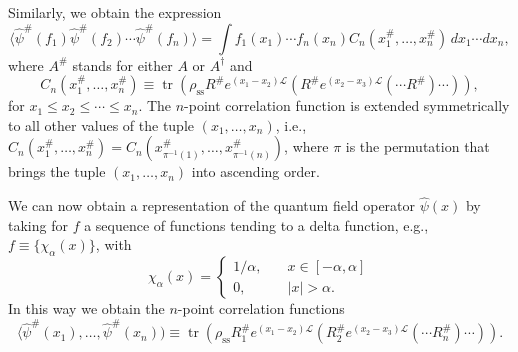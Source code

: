 \documentclass[prl,twocolumn,lengthcheck,superscriptaddress]{revtex4-1}
\newcommand{\tr}{\operatorname{tr}}
\theoremstyle{definition}
\theoremstyle{remark}
\begin{document}
Similarly, we obtain the expression
\begin{equation}
	\langle \widehat{\psi}^{\#}(f_1)\widehat{\psi}^{\#}(f_2)\cdots \widehat{\psi}^{\#}(f_n)\rangle = \int f_1(x_1)\cdots f_n(x_n) C_n(x_1^\#, \ldots, x_n^\#)\, dx_1\cdots dx_n,
\end{equation}
where $A^\#$ stands for either $A$ or $A^\dag$ and 
\begin{equation}
	C_n(x_1^\#, \ldots, x_n^\#) \equiv \tr(\rho_{\text{ss}} R^\# e^{(x_1-x_{2})\mathcal{L}}( R^\# e^{(x_{2}-x_{3})\mathcal{L}}(\cdots R^\#)\cdots)),
\end{equation}
for $x_1 \le x_2 \le \cdots \le x_n$. The $n$-point correlation function is extended symmetrically to all other values of the tuple $(x_1, \ldots, x_n)$, i.e., $C_n(x_1^\#, \ldots, x_n^\#) = C_n(x_{\pi^{-1}(1)}^\#, \ldots, x_{\pi^{-1}(n)}^\#)$, where $\pi$ is the permutation that brings the tuple $(x_1, \ldots, x_n)$ into ascending order.

We can now obtain a representation of the quantum field operator $\widehat{\psi}(x)$ by taking for $f$ a sequence of functions tending to a delta function, e.g., $f \equiv \{\chi_\alpha(x)\}$, with 
\begin{equation}
	\chi_\alpha(x) = \begin{cases} 1/\alpha, \quad &x \in [-\alpha, \alpha]\\
	0, \quad &|x| > \alpha.\end{cases}
\end{equation}
In this way we obtain the $n$-point correlation functions
\begin{equation}
	\langle \widehat{\psi}^\#(x_1), \ldots, \widehat{\psi}^\#(x_n)) \equiv \tr(\rho_{\text{ss}} R^\#_1 e^{(x_1-x_{2})\mathcal{L}}( R^\#_{2} e^{(x_{2}-x_{3})\mathcal{L}}(\cdots R_n^\#)\cdots)).
\end{equation}
\end{document}
